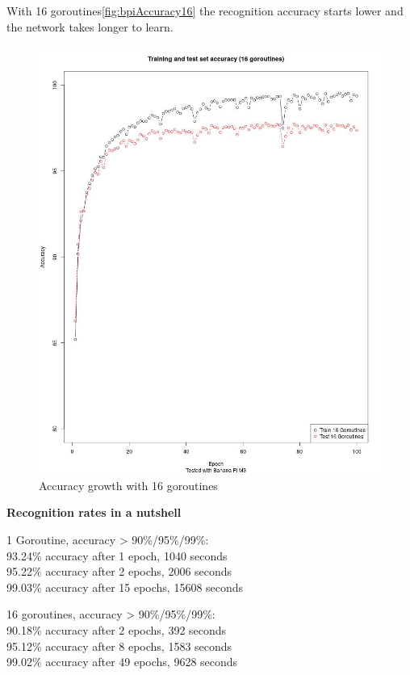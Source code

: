 \documentclass[11pt]{article}
\begin{document}
With 16 goroutines\autoref{fig:bpiAccuracy16} the recognition accuracy starts lower and the network takes longer to learn.
\begin{figure}[H]
	\centering
	\includegraphics[width=1.0\textwidth, height=0.75\textheight]{./Data/Final/Images/bpiAccuracy16.jpg}
	\vspace{-1em}
	\caption{Accuracy growth with 16 goroutines}
	\vspace{-0.5em}
	\label{fig:bpiAccuracy16}
\end{figure}

\newpage
\textbf{Recognition rates in a nutshell}

1 Goroutine, accuracy > 90\%/95\%/99\%:\\
93.24\% accuracy after 1 epoch, 1040 seconds\\
95.22\% accuracy after 2 epochs, 2006 seconds\\
99.03\% accuracy after 15 epochs, 15608 seconds

16 goroutines, accuracy > 90\%/95\%/99\%:\\
90.18\% accuracy after 2 epochs, 392 seconds\\
95.12\% accuracy after 8 epochs, 1583 seconds\\
99.02\% accuracy after 49 epochs, 9628 seconds
\end{document}
